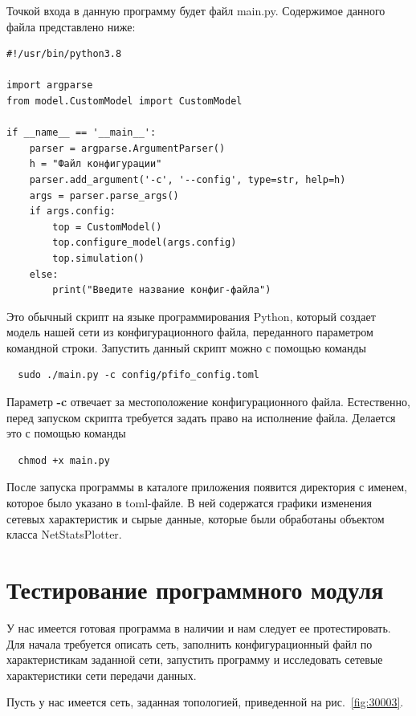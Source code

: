 Точкой входа в данную программу будет файл main.py. Содержимое данного
файла представлено ниже:

\begin{verbatim}
#!/usr/bin/python3.8

import argparse
from model.CustomModel import CustomModel

if __name__ == '__main__':
    parser = argparse.ArgumentParser()
    h = "Файл конфигурации"
    parser.add_argument('-c', '--config', type=str, help=h)
    args = parser.parse_args()
    if args.config:
        top = CustomModel()
        top.configure_model(args.config)
        top.simulation()
    else:
        print("Введите название конфиг-файла")

\end{verbatim}

Это обычный скрипт на языке программирования Python, который создает
модель нашей сети из конфигурационного файла, переданного параметром
командной строки. Запустить данный скрипт можно с помощью команды
\begin{verbatim}
  sudo ./main.py -c config/pfifo_config.toml
\end{verbatim}

Параметр \textbf{-c} отвечает за местоположение конфигурационного
файла.  Естественно, перед запуском скрипта требуется задать право на
исполнение файла. Делается это с помощью команды
\begin{verbatim}
  chmod +x main.py
\end{verbatim}

После запуска программы в каталоге приложения появится директория с
именем, которое было указано в toml-файле. В ней содержатся графики
изменения сетевых характеристик и сырые данные, которые были
обработаны объектом класса NetStatsPlotter.

\section{Тестирование программного модуля}

У нас имеется готовая программа в наличии и нам следует ее
протестировать. Для начала требуется описать сеть, заполнить
конфигурационный файл по характеристикам заданной сети, запустить
программу и исследовать сетевые характеристики сети передачи данных.

Пусть у нас имеется сеть, заданная топологией, приведенной на
рис.~\ref{fig:30003}.

